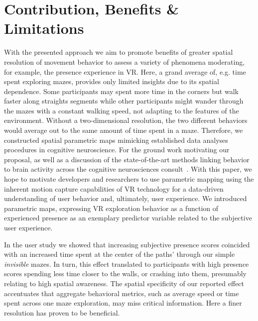 \section{Contribution, Benefits \& Limitations}
With the presented approach we aim to promote benefits of greater spatial resolution of movement behavior to assess a variety of phenomena moderating, for example, the presence experience in VR. Here, a grand average of, e.g. time spent exploring mazes, provides only limited insights due to its spatial dependence. Some participants may spent more time in the corners but walk faster along straights segments while other participants might wander through the mazes with a constant walking speed, not adapting to the features of the environment. Without a two-dimensional resolution, the two different behaviors would average out to the same amount of time spent in a maze. Therefore, we constructed spatial parametric maps mimicking established data analyses procedures in cognitive neuroscience. For the ground work motivating our proposal, as well as a discussion of the state-of-the-art methods linking behavior to brain activity across the cognitive neurosciences consult~\cite{Friston1994b, Bridwell2018a}. With this paper, we hope to motivate developers and researchers to use parametric mapping using the inherent motion capture capabilities of VR technology for a data-driven understanding of user behavior and, ultimately, user experience. We introduced parametric maps, expressing VR exploration behavior as a function of experienced presence as an exemplary predictor variable related to the subjective user experience. 

In the user study we showed that increasing subjective presence scores coincided with an increased time spent at the center of the paths' through our simple \textit{invisible} mazes. In turn, this effect translated to participants with high presence scores spending less time closer to the walls, or crashing into them, presumably relating to high spatial awareness. The spatial specificity of our reported effect accentuates that aggregate behavioral metrics, such as average speed or time spent across one maze exploration, may miss critical information. Here a finer resolution has proven to be beneficial.

